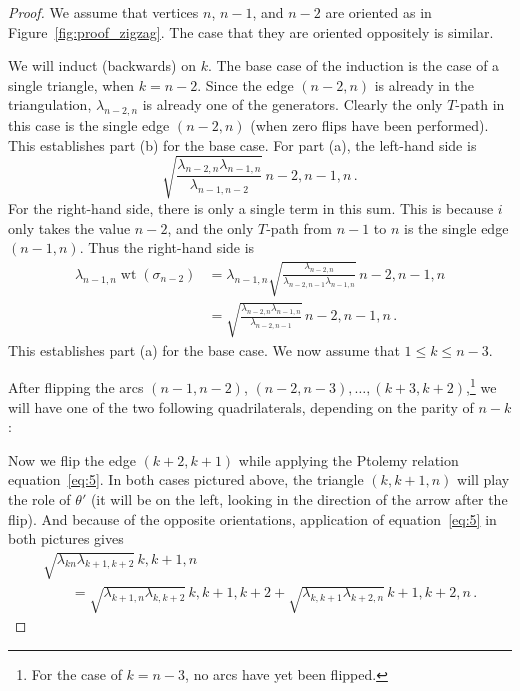 \documentclass[11pt]{article}
\numberwithin{equation}{section}
\newcommand{\midarrow}{\tikz \draw[-triangle 90] (0,0) -- +(.1,0);}
\numberwithin{equation}{section}
\DeclareMathOperator{\wt}{wt}
\begin{document}
\begin{proof}
 We assume that vertices $n$, $n-1$, and $n-2$ are oriented as in Figure~\ref{fig:proof_zigzag}. The case that they are oriented oppositely is similar.

 We will induct (backwards) on $k$.
 The base case of the induction is the case of a single triangle, when $k=n-2$.
 Since the edge $(n-2,n)$ is already in the triangulation, $\lambda_{n-2,n}$ is already one of the generators. Clearly the only $T$-path
 in this case is the single edge $(n-2,n)$ (when zero flips have been performed). This establishes part (b) for the base case.
 For part (a), the left-hand side is
 \[ \sqrt{\frac{\lambda_{n-2,n}\lambda_{n-1,n}}{\lambda_{n-1,n-2}}} \, \boxed{n-2,n-1,n}\,. \]
 For the right-hand side, there is only a single term in this sum. This is because $i$ only takes the value $n-2$,
 and the only $T$-path from $n-1$ to $n$ is the single edge $(n-1,n)$. Thus the right-hand side is
 \begin{align*}
 \lambda_{n-1,n}   \wt(\sigma_{n-2}) &= \lambda_{n-1,n}   \sqrt{\frac{\lambda_{n-2,n}}{\lambda_{n-2,n-1}\lambda_{n-1,n}}} \, \boxed{n-2,n-1,n} \\
 &= \sqrt{\frac{\lambda_{n-2,n}\lambda_{n-1,n}}{\lambda_{n-2,n-1}}} \, \boxed{n-2,n-1,n}\,.
 \end{align*}
 This establishes part (a) for the base case. We now assume that $1 \leq k \leq n-3$.

 After flipping the arcs $(n-1,n-2)$, $(n-2,n-3), \dots, (k+3,k+2)$,\footnote{For the case of $k=n-3$, no arcs have yet been flipped.} we will have one of the two following quadrilaterals, depending on the parity of $n-k$:
 \begin {center}
 \end {center}


 Now we flip the edge $(k+2, k+1)$ while applying the Ptolemy relation equation~\eqref{eq:5}. In both cases pictured above, the triangle $(k,k+1,n)$ will play
 the role of $\theta'$ (it will be on the left, looking in the direction of the arrow after the flip).
 And because of the opposite orientations, application of equation~\eqref{eq:5} in both pictures gives
 \begin{gather*}
 \sqrt{\lambda_{kn} \lambda_{k+1,k+2}} \, \boxed{k,k+1,n} \\
 \qquad{} = \sqrt{\lambda_{k+1,n} \lambda_{k,k+2}} \, \boxed{k,k+1,k+2} + \sqrt{\lambda_{k,k+1} \lambda_{k+2,n}} \, \boxed{k+1,k+2,n}\,.
 \end{gather*}



\end{proof}
\end{document}

